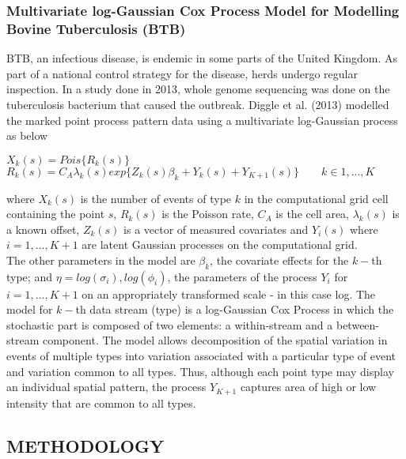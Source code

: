 \documentclass[a4paper]{thesis}
\begin{document}
\subsection{Multivariate log-Gaussian Cox Process Model for Modelling Bovine Tuberculosis (BTB)}

BTB, an infectious disease, is endemic in some parts of the United Kingdom. As part
of a national control strategy for the disease, herds undergo regular inspection. In a study done in 2013, whole genome sequencing was done on the tuberculosis bacterium that caused the outbreak. Diggle et al. (2013) modelled the marked point process pattern data using a multivariate log-Gaussian process as below

\begin{center}
$X_k(s) = Pois \lbrace R_k(s)\rbrace$\\
$R_k(s) = C_A \lambda_k(s) exp \lbrace Z_k(s)\beta_k + Y_k(s) + Y_{K+1}(s)\rbrace \quad \quad k \in 1,...,K$
\end{center}

where $X_k(s)$ is the number of events of type $k$ in the computational grid cell containing the point $s$, $R_k(s)$ is the Poisson rate, $C_A$ is the cell area, $\lambda_k(s)$ is a known offset, $Z_k(s)$ is a vector of measured covariates and $Y_i(s)$ where $i = 1,...,K+1$ are latent Gaussian processes on the computational grid.\\

The other parameters in the model are $\beta_k$, the covariate effects for the $k-$th type; and $\eta = {log(\sigma_i), log(\phi_i)}$, the parameters of the process $Y_i$ for $i = 1,...,K+1$ on an appropriately transformed scale - in this case log. The model for $k-$th data stream (type) is a log-Gaussian Cox Process in which the stochastic part is composed of two elements: a within-stream and a between-stream component. The model allows decomposition of the spatial variation in events of multiple types into variation associated with a particular type of event and variation common to all types. Thus, although each point type may display an individual spatial pattern, the process $Y_{K+1}$ captures area of high or low intensity that are common to all types.

\begin{center}
\chapter{METHODOLOGY}
\end{center} 
\end{document}
